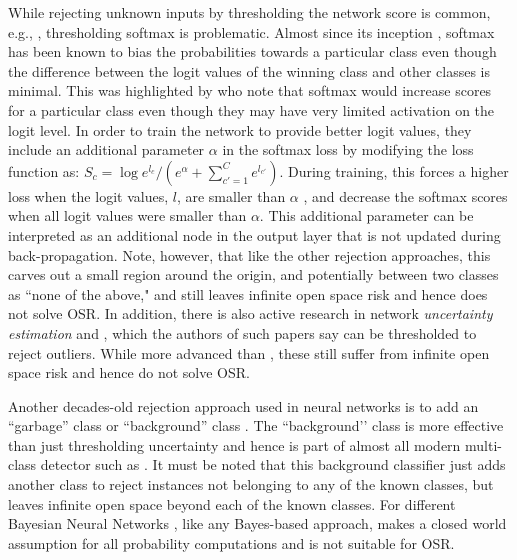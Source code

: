 \documentclass[letterpaper]{article}
\begin{document}
While rejecting unknown inputs by thresholding the network score is common, e.g., \cite{matan1990handwritten,de2000reject},  thresholding softmax is problematic.
Almost since its inception  \cite{bridle1989probablistic}, softmax has been known to bias the probabilities towards a particular class even though the difference between the logit values of the winning class and other classes is minimal.
This was highlighted by  \cite{matan1990handwritten} who note that softmax would increase scores for a particular class even though they may have very limited activation on the logit level.
In order to train the network to provide better logit values, they include an additional parameter $\alpha$ in the softmax loss by modifying the loss function as:
$S_c=\log e^{l_c}/\left({e^\alpha}+\sum_{c'=1}^{C}e^{l_{c'}}\right)$.
During training, this forces a higher loss when the logit values, $l$, are smaller than $\alpha$ , and decrease the softmax scores when all logit values were smaller than $\alpha$.
This additional parameter can be interpreted as an additional node in the output layer that is not updated during back-propagation.
Note, however, that like the other rejection approaches, this carves out a small region around the origin, and potentially between two classes as ``none of the above," and still leaves infinite open space risk and hence does not solve OSR.   
In addition, there is also active research in network \emph{uncertainty estimation} and  \cite{gal2016dropout,lakshminarayanan2017simple,mor2018confidence}, which the authors of such papers say can be thresholded to reject outliers. While more advanced than  \cite{matan1990handwritten}, these still suffer from infinite open space risk and hence do not solve OSR.




Another decades-old rejection approach used in neural networks is to add an  ``garbage” class  \cite{linden1989inversion} or ``background” class  \cite{chang1994figure}.
The ``background’' class is more effective than just thresholding uncertainty and hence is part of almost all modern multi-class detector such as   \cite{liu2016ssd,girshick2015fast,ren2015faster,zhang2018pedestrian}.
It must be noted that this background classifier just adds another class to reject instances not belonging to any of the known classes, but leaves infinite open space beyond each of the known classes.  For different Bayesian Neural Networks  \cite{ghosh2016assumed}, like any Bayes-based approach,  makes a closed world assumption for all probability computations and is not suitable for OSR. 
\end{document}
